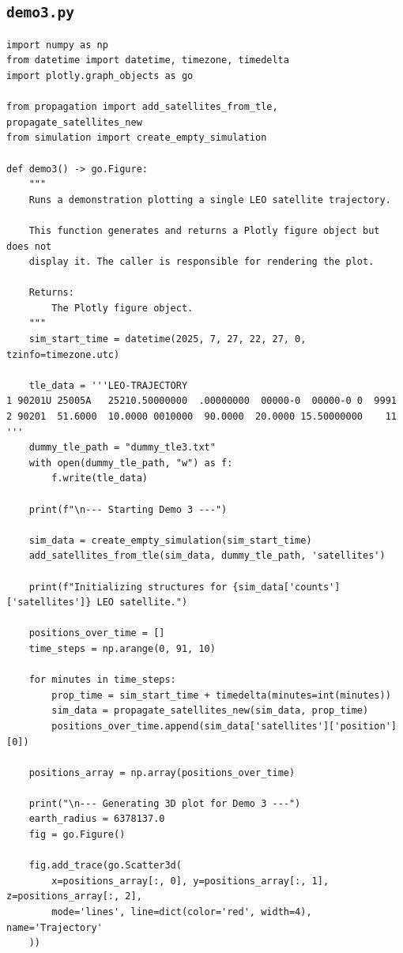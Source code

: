 \documentclass[11pt]{article}
\begin{document}
\subsection{\texttt{demo3.py}}
\begin{Verbatim}
import numpy as np
from datetime import datetime, timezone, timedelta
import plotly.graph_objects as go

from propagation import add_satellites_from_tle, propagate_satellites_new
from simulation import create_empty_simulation

def demo3() -> go.Figure:
    """
    Runs a demonstration plotting a single LEO satellite trajectory.

    This function generates and returns a Plotly figure object but does not
    display it. The caller is responsible for rendering the plot.

    Returns:
        The Plotly figure object.
    """
    sim_start_time = datetime(2025, 7, 27, 22, 27, 0, tzinfo=timezone.utc)

    tle_data = '''LEO-TRAJECTORY
1 90201U 25005A   25210.50000000  .00000000  00000-0  00000-0 0  9991
2 90201  51.6000  10.0000 0010000  90.0000  20.0000 15.50000000    11
'''
    dummy_tle_path = "dummy_tle3.txt"
    with open(dummy_tle_path, "w") as f:
        f.write(tle_data)

    print(f"\n--- Starting Demo 3 ---")

    sim_data = create_empty_simulation(sim_start_time)
    add_satellites_from_tle(sim_data, dummy_tle_path, 'satellites')

    print(f"Initializing structures for {sim_data['counts']['satellites']} LEO satellite.")

    positions_over_time = []
    time_steps = np.arange(0, 91, 10)

    for minutes in time_steps:
        prop_time = sim_start_time + timedelta(minutes=int(minutes))
        sim_data = propagate_satellites_new(sim_data, prop_time)
        positions_over_time.append(sim_data['satellites']['position'][0])

    positions_array = np.array(positions_over_time)

    print("\n--- Generating 3D plot for Demo 3 ---")
    earth_radius = 6378137.0
    fig = go.Figure()

    fig.add_trace(go.Scatter3d(
        x=positions_array[:, 0], y=positions_array[:, 1], z=positions_array[:, 2],
        mode='lines', line=dict(color='red', width=4), name='Trajectory'
    ))


\end{Verbatim}
\end{document}
